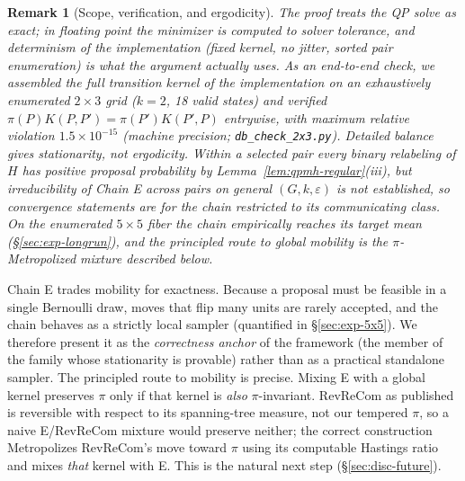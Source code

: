 \documentclass[11pt]{article}
\newtheorem{remark}{Remark}[section]
\begin{document}
\begin{remark}[Scope, verification, and ergodicity]\label{rem:qpmh-scope}
The proof treats the QP solve as exact; in floating point the
minimizer is computed to solver tolerance, and determinism of the
implementation (fixed kernel, no jitter, sorted pair enumeration) is
what the argument actually uses. As an end-to-end check, we assembled
the full transition kernel of the implementation on an exhaustively
enumerated $2 \times 3$ grid ($k = 2$, 18 valid states) and verified
$\pi(P)K(P,P') = \pi(P')K(P',P)$ entrywise, with maximum relative
violation $1.5 \times 10^{-15}$ (machine precision;
\texttt{db\_check\_2x3.py}). Detailed balance
gives stationarity, not ergodicity. Within a selected pair every
binary relabeling of $H$ has positive proposal probability by
Lemma~\ref{lem:qpmh-regular}(iii), but irreducibility of Chain E
across pairs on general $(G, k, \varepsilon)$ is not established, so
convergence statements are for the chain restricted to its
communicating class. On the enumerated $5 \times 5$ fiber the chain
empirically reaches its target mean (\S\ref{sec:exp-longrun}), and
the principled route to global mobility is the $\pi$-Metropolized
mixture described below.
\end{remark}

Chain E trades mobility for exactness. Because a proposal must be
feasible in a single Bernoulli draw, moves that flip many units are
rarely accepted, and the chain behaves as a strictly local sampler
(quantified in \S\ref{sec:exp-5x5}). We therefore present it as the
\emph{correctness anchor} of the framework (the member of the family
whose stationarity is provable) rather than as a practical
standalone sampler. The principled route to mobility is precise.
Mixing E with a global kernel preserves $\pi$ only if that kernel is
\emph{also} $\pi$-invariant. RevReCom as published is reversible with
respect to its spanning-tree measure, not our tempered $\pi$, so a
naive E/RevReCom mixture would preserve neither; the correct
construction Metropolizes RevReCom's move toward $\pi$ using its
computable Hastings ratio~\cite{cannon2022spanning,autry2023metropolized}
and mixes \emph{that} kernel with E. This is the natural next step
(\S\ref{sec:disc-future}).
\end{document}

